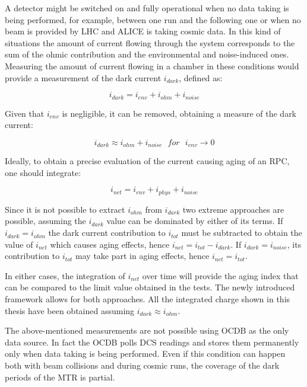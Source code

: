 A detector might be switched on and fully operational when no data taking is being performed, for example, between one run and the following one or when no beam is provided by LHC and ALICE is taking cosmic data.
In this kind of situations the amount of current flowing through the system corresponds to the sum of the ohmic contribution and the environmental and noise-induced ones.
Measuring the amount of current flowing in a chamber in these conditions would provide a measurement of the dark current $i_{dark}$, defined as:

\begin{equation}
\label{eq:idark1}
i_{dark}=i_{env}+i_{ohm}+i_{noise}
\end{equation}

Given that $i_{env}$ is negligible, it can be removed, obtaining a measure of the dark current:

\begin{equation}
\label{eq:idark}
i_{dark}\approx i_{ohm}+i_{noise}\ \ \ for\ \ \ i_{env}\rightarrow0
\end{equation}

Ideally, to obtain a precise evaluation of the current causing aging of an RPC, one should integrate:

\begin{equation}
\label{eq:inet}
i_{net}=i_{env}+i_{phys}+i_{noise}
\end{equation}

Since it is not possible to extract $i_{ohm}$ from $i_{dark}$ two extreme approaches are possible, assuming the $i_{dark}$ value can be dominated by either of its terms.
If $i_{dark}=i_{ohm}$ the dark current contribution to $i_{tot}$ must be subtracted to obtain the value of $i_{net}$ which causes aging effects, hence $i_{net}=i_{tot}-i_{dark}$.
If $i_{dark}=i_{noise}$, its contribution to $i_{tot}$ may take part in aging effects, hence $i_{net}=i_{tot}$.

In either cases, the integration of $i_{net}$ over time will provide the aging index that can be compared to the limit value obtained in the tests.
The newly introduced framework allows for both approaches.
All the integrated charge shown in this thesis have been obtained assuming $i_{dark}\approx i_{ohm}$.

The above-mentioned measurements are not possible using OCDB as the only data source.
In fact the OCDB polls DCS readings and stores them permanently only when data taking is being performed.
Even if this condition can happen both with beam collisions and during cosmic runs, the coverage of the dark periods of the MTR is partial.

